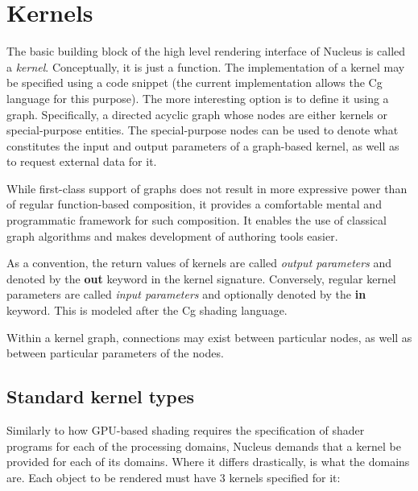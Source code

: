 \section{Kernels}
\label{sec:Kernels}

The basic building block of the high level rendering interface of Nucleus is called a \emph{kernel}. Conceptually, it is just a function. The implementation of a kernel may be specified using a code snippet (the current implementation allows the Cg language for this purpose). The more interesting option is to define it using a graph. Specifically, a directed acyclic graph whose nodes are either kernels or special-purpose entities. The special-purpose nodes can be used to denote what constitutes the input and output parameters of a graph-based kernel, as well as to request external data for it.

While first-class support of graphs does not result in more expressive power than of regular function-based composition, it provides a comfortable mental and programmatic framework for such composition. It enables the use of classical graph algorithms and makes development of authoring tools easier.

As a convention, the return values of kernels are called \emph{output parameters} and denoted by the \textbf{out} keyword in the kernel signature. Conversely, regular kernel parameters are called \emph{input parameters} and optionally denoted by the \textbf{in} keyword. This is modeled after the Cg shading language.

Within a kernel graph, connections may exist between particular nodes, as well as between particular parameters of the nodes.

\subsection{Standard kernel types}

Similarly to how GPU-based shading requires the specification of shader programs for each of the processing domains, Nucleus demands that a kernel be provided for each of its domains. Where it differs drastically, is what the domains are. Each object to be rendered must have 3 kernels specified for it:

